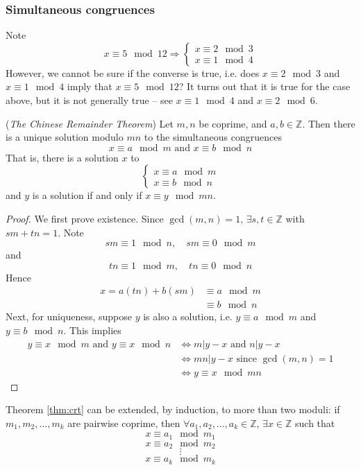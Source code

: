 \documentclass[10pt, a4paper, twoside]{report}
\begin{document}
\subsubsection{Simultaneous congruences}
Note 
\[x\equiv 5\mod 12\Rightarrow\begin{cases}
    x\equiv 2\mod 3 \\
    x\equiv 1\mod 4
\end{cases}\]
However, we cannot be sure if the converse is true, i.e. does \(x\equiv 2\mod 3\) and \(x\equiv 1\mod 4\) imply that \(x\equiv 5\mod 12\)? It turns out that it is true for the case above, but it is not generally true -- see \(x\equiv 1\mod 4\) and \(x\equiv 2\mod 6\).
\begin{theorem}
    (\emph{The Chinese Remainder Theorem}) Let \(m,n\) be coprime, and \(a,b\in\mathbb{Z}\). Then there is a unique solution modulo \(mn\) to the simultaneous congruences 
    \[x\equiv a\mod m\text{  and  }x\equiv b\mod n\]
    That is, there is a solution \(x\) to 
    \[\begin{cases}
        x\equiv a\mod m \\
        x\equiv b\mod n
    \end{cases}\]
    and \(y\) is a solution if and only if \(x\equiv y\mod mn\).
    \label{thm:crt}
\end{theorem}
\begin{proof}
    We first prove existence. Since \(\gcd(m,n)=1\), \(\exists s,t\in\mathbb{Z}\) with \(sm+tn=1\). Note 
    \[sm\equiv 1\mod n,\quad sm\equiv 0\mod m\]
    and 
    \[tn\equiv 1\mod m,\quad tn\equiv 0\mod n\]
    Hence 
    \begin{align*}
        x=a(tn)+b(sm)&\equiv a\mod m \\
        &\equiv b\mod n 
    \end{align*}
    Next, for uniqueness, suppose \(y\) is also a solution, i.e. \(y\equiv a\mod m\) and \(y\equiv b\mod n\). This implies 
    \begin{align*}
        y\equiv x\mod m\text{  and  }y\equiv x\mod n&\Leftrightarrow m|y-x\text{  and }n|y-x \\
        &\Leftrightarrow mn|y-x \text{  since  } \gcd(m,n)=1 \\
        &\Leftrightarrow y\equiv x\mod mn
    \end{align*}
\end{proof}
\begin{remark}
    Theorem \ref{thm:crt} can be extended, by induction, to more than two moduli: \newline if \(m_1,m_2,\ldots,m_k\) are pairwise coprime, then \(\forall a_1,a_2,\ldots,a_k\in\mathbb{Z}\), \(\exists x\in\mathbb{Z}\) such that 
    \[x\equiv a_1\mod m_1\]
    \[x\equiv a_2\mod m_2\]
    \[\vdots\]
    \[x\equiv a_k\mod m_k\]
\end{remark}
\end{document}
